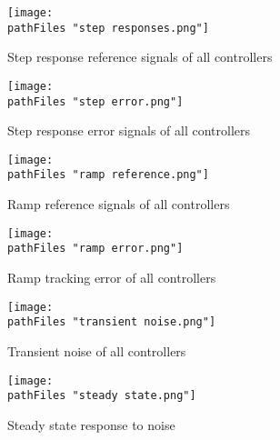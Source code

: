 \documentclass[
	12pt, %
]{fphw}
\newcommand\pathFiles{"summary/"}
\begin{document}
\begin{figure}[!htb]
  \centering
  \begin{minipage}[b]{0.45\textwidth}
      \texttt{[image: \\pathFiles "step responses.png"]}
    \caption{Step response reference signals of all controllers}
    \label{step}
  \end{minipage}
  \hfill
  \begin{minipage}[b]{0.45\textwidth}
    \texttt{[image: \\pathFiles "step error.png"]}
    \caption{Step response error signals of all controllers}
    \label{step err}
    \end{minipage}
\end{figure}

\begin{figure}[!htb]
  \centering
  \begin{minipage}[b]{0.45\textwidth}
      \texttt{[image: \\pathFiles "ramp reference.png"]}
    \caption{Ramp reference signals of all controllers}
    \label{ramp}
  \end{minipage}
  \hfill
  \begin{minipage}[b]{0.45\textwidth}
      \texttt{[image: \\pathFiles "ramp error.png"]}
    \caption{Ramp tracking error of all controllers}
    \label{ramp err}
    \end{minipage}
\end{figure}

\begin{figure}[!htb]
  \centering
  \begin{minipage}[b]{0.45\textwidth}
    \texttt{[image: \\pathFiles "transient noise.png"]}
    \caption{Transient noise of all controllers}
    \label{transient}
  \end{minipage}
  \hfill
  \begin{minipage}[b]{0.45\textwidth}
    \texttt{[image: \\pathFiles "steady state.png"]}
    \caption{Steady state response to noise}
    \label{steady state}
    \end{minipage}
\end{figure}
\end{document}
